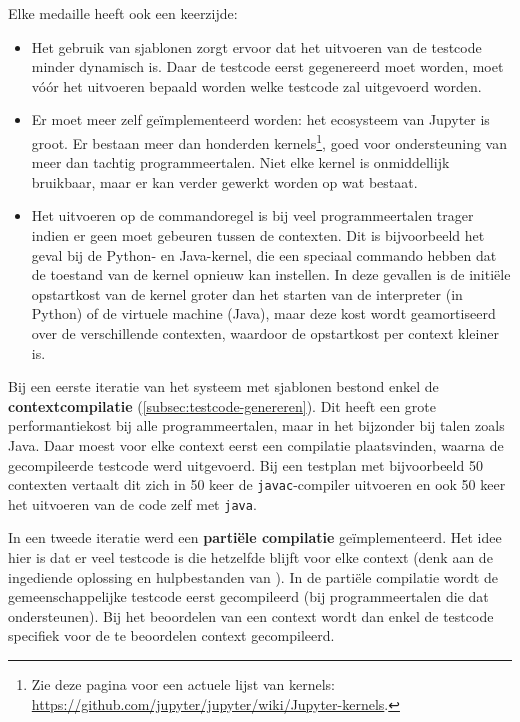 Elke medaille heeft ook een keerzijde:
\begin{itemize}
    \item Het gebruik van sjablonen zorgt ervoor dat het uitvoeren van de testcode minder dynamisch is.
    Daar de testcode eerst gegenereerd moet worden, moet vóór het uitvoeren bepaald worden welke testcode zal uitgevoerd worden.
    \item Er moet meer zelf geïmplementeerd worden: het ecosysteem van Jupyter is groot.
    Er bestaan meer dan honderden kernels\footnote{Zie deze pagina voor een actuele lijst van kernels: \url{https://github.com/jupyter/jupyter/wiki/Jupyter-kernels}.}, goed voor ondersteuning van meer dan tachtig programmeertalen.
    Niet elke kernel is onmiddellijk bruikbaar, maar er kan verder gewerkt worden op wat bestaat.
    \item Het uitvoeren op de commandoregel is bij veel programmeertalen trager indien er geen  moet gebeuren tussen de contexten.
    Dit is bijvoorbeeld het geval bij de Python- en Java-kernel, die een speciaal commando hebben dat de toestand van de kernel opnieuw kan instellen.
    In deze gevallen is de initiële opstartkost van de kernel groter dan het starten van de interpreter (in Python) of de virtuele machine (Java), maar deze kost wordt geamortiseerd over de verschillende contexten, waardoor de opstartkost per context kleiner is.
\end{itemize}

Bij een eerste iteratie van het systeem met sjablonen bestond enkel de \textbf{contextcompilatie} (\cref{subsec:testcode-genereren}).
Dit heeft een grote performantiekost bij alle programmeertalen, maar in het bijzonder bij talen zoals Java.
Daar moest voor elke context eerst een compilatie plaatsvinden, waarna de gecompileerde testcode werd uitgevoerd.
Bij een testplan met bijvoorbeeld 50 contexten vertaalt dit zich in 50 keer de \texttt{javac}-compiler uitvoeren en ook 50 keer het uitvoeren van de code zelf met \texttt{java}.

In een tweede iteratie werd een \textbf{partiële compilatie} geïmplementeerd.
Het idee hier is dat er veel testcode is die hetzelfde blijft voor elke context (denk aan de ingediende oplossing en hulpbestanden van \tested{}).
In de partiële compilatie wordt de gemeenschappelijke testcode eerst gecompileerd (bij programmeertalen die dat ondersteunen).
Bij het beoordelen van een context wordt dan enkel de testcode specifiek voor de te beoordelen context gecompileerd.

